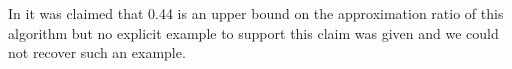 In \cite{khuller1999budgeted} it was claimed that 0.44 is an upper bound on the approximation ratio of this algorithm but no explicit example to support this claim was given and we could not recover such an example.

% 
% 
% 
%   